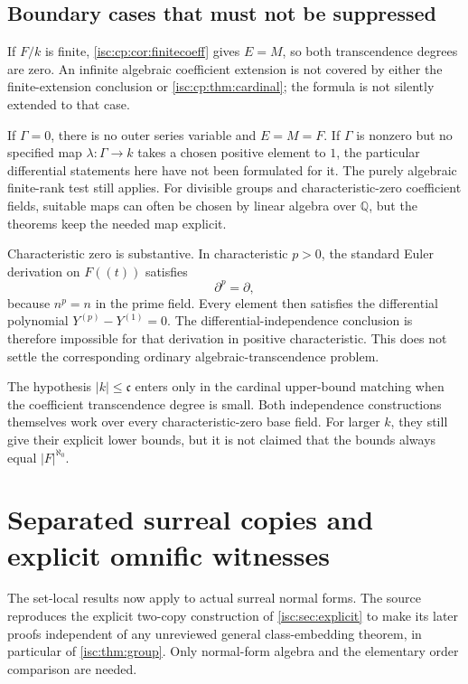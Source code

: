 \documentclass[11pt,letterpaper]{article}
\theoremstyle{definition}
\theoremstyle{remark}
\newcommand{\Q}{\mathbb Q}
\newcommand{\cc}{\mathfrak c}
\numberwithin{equation}{section}
\begin{document}
\subsection{Boundary cases that must not be suppressed}\label{isc:cp:sub:boundary}

If $F/k$ is finite, \cref{isc:cp:cor:finitecoeff} gives $E=M$, so both
transcendence degrees are zero. An infinite algebraic coefficient extension
is not covered by either the finite-extension conclusion or
\cref{isc:cp:thm:cardinal}; the formula is not silently extended to that
case.

If $\Gamma=0$, there is no outer series variable and $E=M=F$. If $\Gamma$
is nonzero but no specified map $\lambda:\Gamma\to k$ takes a chosen
positive element to $1$, the particular differential statements here have
not been formulated for it. The purely algebraic finite-rank test still
applies. For divisible groups and characteristic-zero coefficient fields,
suitable maps can often be chosen by linear algebra over $\Q$, but the
theorems keep the needed map explicit.

Characteristic zero is substantive. In characteristic $p>0$, the standard
Euler derivation on $F((t))$ satisfies
\[
 \partial^p=\partial,
\]
because $n^p=n$ in the prime field. Every element then satisfies the
differential polynomial $Y^{(p)}-Y^{(1)}=0$. The differential-independence
conclusion is therefore impossible for that derivation in positive
characteristic. This does not settle the corresponding ordinary
algebraic-transcendence problem.

The hypothesis $|k|\le\cc$ enters only in the cardinal upper-bound matching
when the coefficient transcendence degree is small. Both independence
constructions themselves work over every characteristic-zero base field.
For larger $k$, they still give their explicit lower bounds, but it is not
claimed that the bounds always equal $|F|^{\aleph_0}$.

\section{Separated surreal copies and explicit omnific witnesses}
\label{isc:cp:sec:surreal}

The set-local results now apply to actual surreal normal forms. The
source reproduces the explicit two-copy construction of
\cref{isc:sec:explicit} to make its later proofs independent of any
unreviewed general class-embedding theorem, in particular of
\cref{isc:thm:group}. Only normal-form algebra and the elementary order
comparison are needed.
\end{document}
